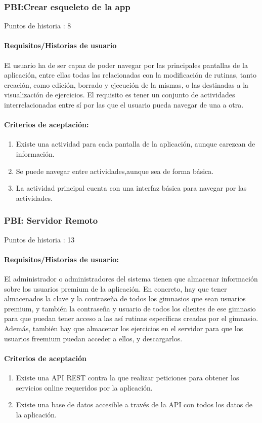 \documentclass[11pt,a4paper]{report}
\begin{document}
\subsubsection{PBI:Crear esqueleto de la app}
Puntos de historia : 8
\paragraph{Requisitos/Historias de usuario}
El usuario ha de ser capaz de poder navegar por las principales pantallas de la aplicación, entre ellas todas las relacionadas con la modificación de rutinas, tanto creación, como edición, borrado y ejecución de la mismas, o las destinadas a la visualización de ejercicios. El requisito es tener un conjunto de actividades interrelacionadas entre sí por las que el usuario pueda navegar de una a otra.
\paragraph{Criterios de aceptación:}
\begin{enumerate}
	\item Existe una actividad para cada pantalla de la aplicación, aunque carezcan de información.
	\item Se puede navegar entre actividades,aunque sea de forma básica.
	\item La actividad principal cuenta con una interfaz básica para navegar por las actividades.
\end{enumerate}
\subsubsection{PBI: Servidor Remoto}
Puntos de historia : 13
\paragraph{Requisitos/Historias de usuario: } 

El administrador o administradores del sistema tienen que almacenar información sobre los usuarios premium de la aplicación. En concreto, hay que tener almacenados la clave y la contraseña de todos los gimnasios que sean usuarios premium, y también la contraseña y usuario de todos los clientes de ese gimnasio para que puedan tener acceso a las así  rutinas específicas creadas por el gimnasio. Además, también hay que almacenar los ejercicios en el servidor para que los usuarios freemium puedan acceder a ellos, y descargarlos.
\paragraph{Criterios de aceptación}
\begin{enumerate}
	\item Existe una API REST contra la que realizar peticiones para obtener los servicios
	online requeridos por la aplicación.
	\item Existe una base de datos accesible a través de la API con todos los datos de la
	aplicación.
\end{enumerate}
\end{document}

